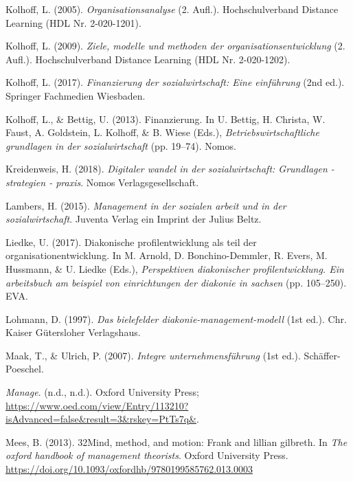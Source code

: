 \documentclass[
  letterpaper,
]{book}
\newlength{\cslhangindent}
\newenvironment{CSLReferences}[2] %
 {\begin{list}{}{%
  \setlength{\itemindent}{0pt}
  \setlength{\leftmargin}{0pt}
  \setlength{\parsep}{0pt}
  \ifodd #1
   \setlength{\leftmargin}{\cslhangindent}
   \setlength{\itemindent}{-1\cslhangindent}
  \fi
  \setlength{\itemsep}{#2\baselineskip}}}
 {\end{list}}
\begin{document}
\begin{CSLReferences}{1}{0}
Kolhoff, L. (2005). \emph{Organisationsanalyse} (2. Aufl.).
Hochschulverband Distance Learning (HDL Nr. 2-020-1201).

Kolhoff, L. (2009). \emph{Ziele, modelle und methoden der
organisationsentwicklung} (2. Aufl.). Hochschulverband Distance Learning
(HDL Nr. 2-020-1202).

Kolhoff, L. (2017). \emph{Finanzierung der sozialwirtschaft: Eine
einführung} (2nd ed.). Springer Fachmedien Wiesbaden.

Kolhoff, L., \& Bettig, U. (2013). Finanzierung. In U. Bettig, H.
Christa, W. Faust, A. Goldstein, L. Kolhoff, \& B. Wiese (Eds.),
\emph{Betriebswirtschaftliche grundlagen in der sozialwirtschaft} (pp.
19--74). Nomos.

Kreidenweis, H. (2018). \emph{Digitaler wandel in der sozialwirtschaft:
Grundlagen - strategien - praxis}. Nomos Verlagsgesellschaft.

Lambers, H. (2015). \emph{Management in der sozialen arbeit und in der
sozialwirtschaft}. Juventa Verlag ein Imprint der Julius Beltz.

Liedke, U. (2017). Diakonische profilentwicklung als teil der
organisationentwicklung. In M. Arnold, D. Bonchino-Demmler, R. Evers, M.
Hussmann, \& U. Liedke (Eds.), \emph{Perspektiven diakonischer
profilentwicklung. Ein arbeitsbuch am beispiel von einrichtungen der
diakonie in sachsen} (pp. 105--250). EVA.

Lohmann, D. (1997). \emph{Das bielefelder diakonie-management-modell}
(1st ed.). Chr. Kaiser Gütersloher Verlagshaus.

Maak, T., \& Ulrich, P. (2007). \emph{Integre unternehmensf{ü}hrung}
(1st ed.). Sch{ä}ffer-Poeschel.

\emph{Manage}. (n.d., n.d.). Oxford University Press;
\url{https://www.oed.com/view/Entry/113210?isAdvanced=false&result=3&rskey=PtTs7q&}.

Mees, B. (2013). 32Mind, method, and motion: Frank and lillian gilbreth.
In \emph{The oxford handbook of management theorists}. Oxford University
Press. \url{https://doi.org/10.1093/oxfordhb/9780199585762.013.0003}


\end{CSLReferences}
\end{document}
